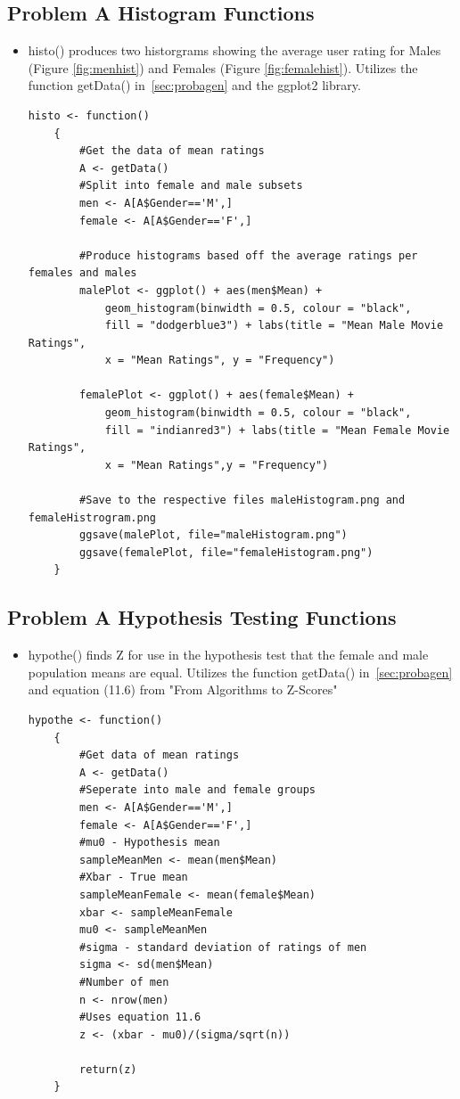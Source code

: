 \documentclass[11pt]{article}  %
\begin{document}
\subsection{Problem A Histogram Functions}
\label{sec:probahisto}
\begin{itemize}
    
    \item histo() produces two historgrams showing the average user rating for Males (Figure \ref{fig:menhist}) and Females (Figure \ref{fig:femalehist}). Utilizes the function getData() in~\ref{sec:probagen} and the ggplot2 library.
    \begin{lstlisting}[basicstyle=\small]
    histo <- function()
    {
    	#Get the data of mean ratings
    	A <- getData()
    	#Split into female and male subsets
    	men <- A[A$Gender=='M',]
    	female <- A[A$Gender=='F',]
    
    	#Produce histograms based off the average ratings per females and males
    	malePlot <- ggplot() + aes(men$Mean) + 
    	    geom_histogram(binwidth = 0.5, colour = "black",
    	    fill = "dodgerblue3") + labs(title = "Mean Male Movie Ratings",
    	    x = "Mean Ratings", y = "Frequency")
    	
    	femalePlot <- ggplot() + aes(female$Mean) + 
    	    geom_histogram(binwidth = 0.5, colour = "black",
    	    fill = "indianred3") + labs(title = "Mean Female Movie Ratings",
    	    x = "Mean Ratings",y = "Frequency")
    	
    	#Save to the respective files maleHistogram.png and femaleHistrogram.png
    	ggsave(malePlot, file="maleHistogram.png")
    	ggsave(femalePlot, file="femaleHistogram.png")
    }
    \end{lstlisting}
\end{itemize}

\subsection{Problem A Hypothesis Testing Functions}
\label{sec:probahypo}
\begin{itemize}
    
    \item hypothe() finds Z for use in the hypothesis test that the female and male population means are equal. Utilizes the function getData() in~\ref{sec:probagen} and equation (11.6) from "From Algorithms to Z-Scores"
    \begin{lstlisting}[basicstyle=\small]
    hypothe <- function()
    {
    	#Get data of mean ratings
    	A <- getData()
    	#Seperate into male and female groups
    	men <- A[A$Gender=='M',]
    	female <- A[A$Gender=='F',]
    	#mu0 - Hypothesis mean
    	sampleMeanMen <- mean(men$Mean)
    	#Xbar - True mean
    	sampleMeanFemale <- mean(female$Mean)
    	xbar <- sampleMeanFemale
    	mu0 <- sampleMeanMen
    	#sigma - standard deviation of ratings of men
    	sigma <- sd(men$Mean)
    	#Number of men
    	n <- nrow(men)
    	#Uses equation 11.6
    	z <- (xbar - mu0)/(sigma/sqrt(n))
    
    	return(z)
    }
    \end{lstlisting}
\end{itemize}
\end{document}

